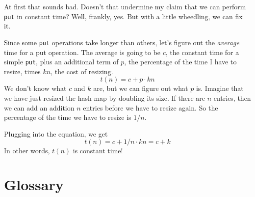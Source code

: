 \documentclass[12pt]{book}
\theoremstyle{exercise}
\begin{document}
At first that sounds bad.  Doesn't that undermine my
claim that we can perform {\tt put} in constant time?  Well,
frankly, yes.  But with a little wheedling, we can fix it.

Since some {\tt put} operations take longer than others, let's
figure out the {\em average} time for a put operation.  The
average is going to be $c$, the constant time for a simple
{\tt put}, plus an additional term of $p$, the percentage of
the time I have to resize, times $kn$, the cost
of resizing.
%
\begin{equation}
t(n) = c + p \cdot kn
\end{equation}
%
We don't know what $c$ and $k$ are, but we can figure out what
$p$ is.  Imagine that we have just resized the hash map by
doubling its size.  If there are $n$ entries, then we can add an
addition $n$ entries before we have to resize again.  So the
percentage of the time we have to resize is $1/n$.

Plugging into the equation, we get
%
\begin{equation}
t(n) = c + 1/n \cdot kn = c + k
\end{equation}
%
In other words, $t(n)$ is constant time!


\section{Glossary}
\end{document}
